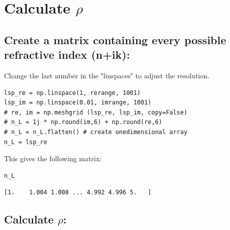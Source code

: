 \documentclass[11pt]{article}
\begin{document}
\section{Calculate \(\rho\)}
\label{sec:orgb3450dc}
\subsection{Create a matrix containing every possible refractive index (n+ik):}
\label{sec:org9c3a06d}

Change the last number in the "linspaces" to adjust the resolution.

\begin{verbatim}
lsp_re = np.linspace(1, rerange, 1001)
lsp_im = np.linspace(0.01, imrange, 1001)
# re, im = np.meshgrid (lsp_re, lsp_im, copy=False)
# n_L = 1j * np.round(im,6) + np.round(re,6)
# n_L = n_L.flatten() # create onedimensional array
n_L = lsp_re
\end{verbatim}

This gives the following matrix:
\begin{verbatim}
n_L
\end{verbatim}

\begin{verbatim}
[1.    1.004 1.008 ... 4.992 4.996 5.   ]
\end{verbatim}

\subsection{Calculate \(\rho\):}
\label{sec:org6938a55}
\end{document}
